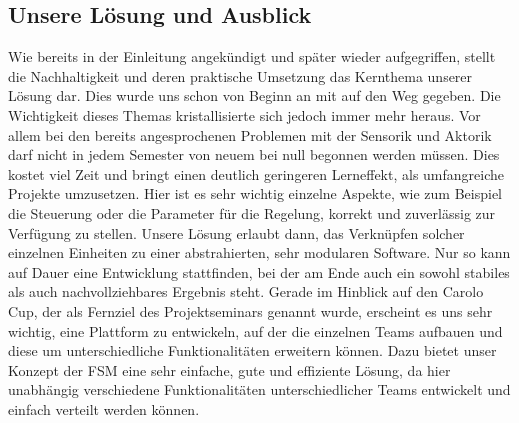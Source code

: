 \subsection{Unsere Lösung und Ausblick}
Wie bereits in der Einleitung angekündigt und später wieder aufgegriffen, stellt die Nachhaltigkeit und deren praktische Umsetzung das Kernthema unserer Lösung dar. Dies wurde uns schon von Beginn an mit auf den Weg gegeben. Die Wichtigkeit dieses Themas kristallisierte sich jedoch immer mehr heraus. Vor allem bei den bereits angesprochenen Problemen mit der Sensorik und Aktorik darf nicht in jedem Semester von neuem bei null begonnen werden müssen. Dies kostet viel Zeit und bringt einen deutlich geringeren Lerneffekt, als umfangreiche Projekte umzusetzen. Hier ist es sehr wichtig einzelne Aspekte, wie zum Beispiel die Steuerung oder die Parameter für die Regelung, korrekt und zuverlässig zur Verfügung zu stellen. Unsere Lösung erlaubt dann, das Verknüpfen solcher einzelnen Einheiten zu einer abstrahierten, sehr modularen Software. Nur so kann auf Dauer eine Entwicklung stattfinden, bei der am Ende auch ein sowohl stabiles als auch nachvollziehbares Ergebnis steht.
\newline
\newline
Gerade im Hinblick auf den Carolo Cup, der als Fernziel des Projektseminars genannt wurde, erscheint es uns sehr wichtig, eine Plattform zu entwickeln, auf der die einzelnen Teams aufbauen  und diese um unterschiedliche Funktionalitäten erweitern können. Dazu bietet unser Konzept der FSM eine sehr einfache, gute und effiziente Lösung, da hier unabhängig verschiedene Funktionalitäten unterschiedlicher Teams entwickelt und einfach verteilt werden können.